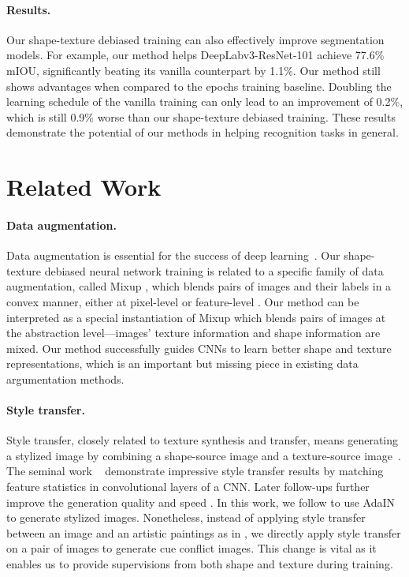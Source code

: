 \documentclass{article} \usepackage{iclr2021_conference,times}
\begin{document}
\paragraph{Results.} Our shape-texture debiased training can also effectively improve segmentation models. For example, our method helps DeepLabv3-ResNet-101 achieve 77.6\% mIOU, significantly beating its vanilla counterpart by 1.1\%. Our method still shows advantages when compared to the  epochs training baseline. Doubling the learning schedule of the vanilla training can only lead to an improvement of 0.2\%, which is still 0.9\% worse than our shape-texture debiased training.
These results demonstrate the potential of our methods in helping recognition tasks in general.

\section{Related Work}

\paragraph{Data augmentation.}
Data augmentation is essential for the success of deep learning~\citep{lecun1998gradient,Krizhevsky2012,simonyan2014very,zhong2017random,
cubuk2019autoaugment,lim2019fast,cubuk2020randaugment}.
Our shape-texture debiased neural network training is related to a specific family of data augmentation, called Mixup \citep{zhang2018mixup}, which blends pairs of images and their labels in a convex manner, either at pixel-level \citep{zhang2018mixup,yun2019cutmix} or feature-level \citep{verma2019manifold,li2020feature}.
Our method can be interpreted as a special instantiation of Mixup which blends pairs of images at the abstraction level---images' texture information and shape information are mixed.  Our method successfully guides CNNs to learn better shape and texture representations, which is an important but missing piece in existing data argumentation methods.

\paragraph{Style transfer.} Style transfer, closely related to texture synthesis and transfer, means generating a stylized image by combining a shape-source image and a texture-source image~\citep{efros1999texture,efros2001image,elad2017style}. The seminal work ~\citep{gatys2016image} demonstrate impressive style transfer results by matching feature statistics in convolutional layers of a CNN. Later follow-ups further improve the generation quality and speed
\citep{huang2017arbitrary,chen2016fast,ghiasi2017exploring,li2017universal}. 
In this work, we follow \citet{geirhos2018imagenettrained} to use AdaIN \citep{huang2017arbitrary} to generate stylized images. Nonetheless, instead of applying style transfer between an image and an artistic paintings as in \citet{geirhos2018imagenettrained}, we directly apply style transfer on a pair of images to generate cue conflict images.
This change is vital as it enables us to provide supervisions from both shape and texture during training.
\end{document}
